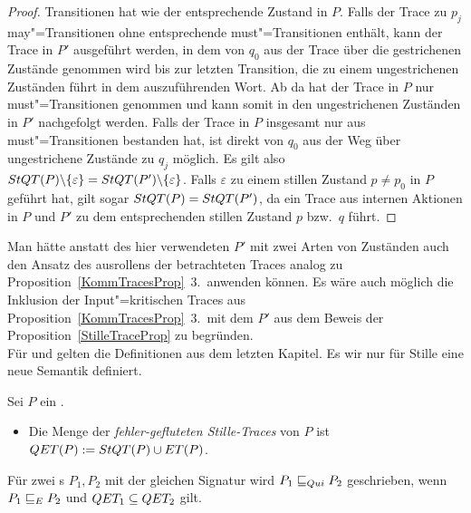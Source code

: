 \begin{proof}
  Transitionen hat wie der entsprechende Zustand in $P$. Falls der Trace zu
  $p_j$ may"=Transitionen ohne entsprechende must"=Transitionen enthält, kann
  der Trace in $P'$ ausgeführt werden, in dem von $q_0$ aus der Trace über die
  gestrichenen Zustände genommen wird bis zur letzten Transition, die zu einem
  ungestrichenen Zuständen führt in dem auszuführenden Wort. Ab da hat der
  Trace in $P$ nur must"=Transitionen genommen und kann somit in den
  ungestrichenen Zuständen in $P'$ nachgefolgt werden. Falls der Trace in $P$
  insgesamt nur aus must"=Transitionen bestanden hat, ist direkt von $q_0$ aus
  der Weg über ungestrichene Zustände zu $q_j$ möglich. Es gilt also $StQT
  (P)\backslash \{\varepsilon\} = StQT (P')\backslash \{\varepsilon\}$. Falls
  $\varepsilon$ zu einem stillen Zustand $p \neq p_0$ in $P$ geführt hat, gilt
  sogar $StQT(P) = StQT (P')$, da ein Trace aus internen Aktionen in $P$ und
  $P'$ zu dem entsprechenden stillen Zustand $p$ bzw.\ $q$ führt.
\end{proof}

Man hätte anstatt des hier verwendeten $P'$ mit zwei Arten von Zuständen auch
den Ansatz des ausrollens der betrachteten Traces analog zu
Proposition~\ref{KommTracesProp}~3.\ anwenden können. Es wäre auch möglich die
Inklusion der Input"=kritischen Traces aus Proposition~\ref{KommTracesProp}~3.\
mit dem $P'$ aus dem Beweis der Proposition~\ref{StilleTraceProp} zu
begründen.\\
Für \ET{} und \EL{} gelten die Definitionen aus dem letzten Kapitel. Es wir nur
für Stille eine neue Semantik definiert.

\begin{Def}
  \label{StilleSemDef}
  Sei $P$ ein \MEIO{}.
  \begin{itemize}
    \item Die Menge der \emph{fehler-gefluteten Stille-Traces} von $P$ ist $QET
      (P):= StQT (P)\cup ET (P)$.
  \end{itemize}
  Für zwei \MEIO{}s $P_1,P_2$ mit der gleichen Signatur wird $P_1 \sqsubseteq  _{Qui}{} P_2$
  geschrieben, wenn $P_1 \sqsubseteq  _E{} P_2$ und $QET _1\subseteq QET _2$ gilt.
\end{Def}

\vspace{0.2cm}

